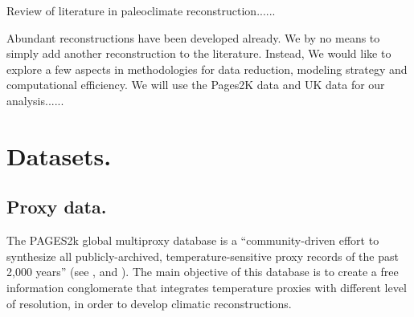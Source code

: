 \documentclass[11pt]{amsart}
\theoremstyle{plain}
\theoremstyle{definition}
\theoremstyle{remark}
\begin{document}
Review of literature in paleoclimate reconstruction......

Abundant reconstructions have been developed already. We by no means to simply add another reconstruction to the literature. Instead, We would like to explore a few aspects in methodologies for data reduction, modeling strategy and computational efficiency.  We will use the Pages2K data and UK data for our analysis......

\section{Datasets.}
\label{sec:data}

\subsection{Proxy data.}
The PAGES2k global multiproxy database is a ``community-driven effort to
synthesize all publicly-archived, temperature-sensitive proxy records of the
past 2,000 years'' (see \cite{Kaufman2014}, \cite{PAGES2KConsortium2013} and \cite{PAGES2kConsortium2017}). The main objective of this database is
to create a free information conglomerate that integrates temperature proxies
with different level of resolution, in order to develop climatic
reconstructions.
\end{document}
